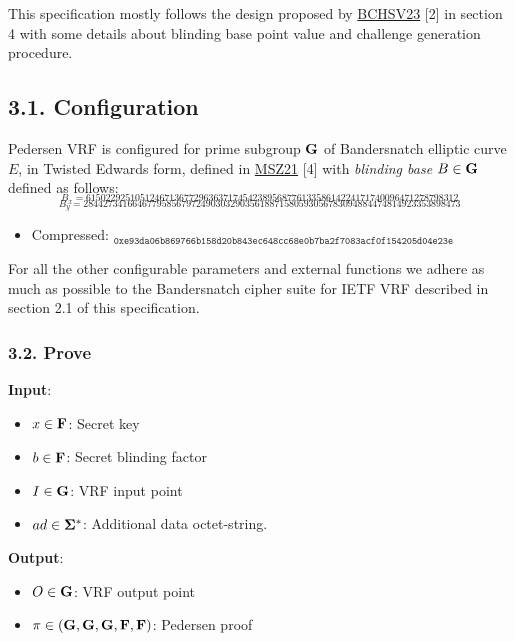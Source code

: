 \documentclass[
]{article}
\providecommand{\tightlist}{%
  \setlength{\itemsep}{0pt}\setlength{\parskip}{0pt}}
\begin{document}
This specification mostly follows the design proposed by
\href{https://eprint.iacr.org/2023/002}{BCHSV23} {[}2{]} in section 4
with some details about blinding base point value and challenge
generation procedure.

\subsection{3.1. Configuration}\label{configuration-1}

Pedersen VRF is configured for prime subgroup \(\bold{G}\) of
Bandersnatch elliptic curve \(E\), in Twisted Edwards form, defined in
\href{https://eprint.iacr.org/2021/1152}{MSZ21} {[}4{]} with
\emph{blinding base} \(B \in \bold{G}\) defined as follows:
\[_{B_x = 6150229251051246713677296363717454238956877613358614224171740096471278798312}\]
\[_{B_y = 28442734166467795856797249030329035618871580593056783094884474814923353898473}\]

\begin{itemize}
\tightlist
\item
  Compressed:
  \(_{\texttt{0xe93da06b869766b158d20b843ec648cc68e0b7ba2f7083acf0f154205d04e23e}}\)
\end{itemize}

For all the other configurable parameters and external functions we
adhere as much as possible to the Bandersnatch cipher suite for IETF VRF
described in section 2.1 of this specification.

\subsubsection{3.2. Prove}\label{prove-1}

\textbf{Input}:

\begin{itemize}
\tightlist
\item
  \(x \in \bold{F}\): Secret key
\item
  \(b \in \bold{F}\): Secret blinding factor
\item
  \(I \in \bold{G}\): VRF input point
\item
  \(ad \in \bold{\Sigma}^*\): Additional data octet-string.
\end{itemize}

\textbf{Output}:

\begin{itemize}
\tightlist
\item
  \(O \in \bold{G}\): VRF output point
\item
  \(\pi \in (\bold{G}, \bold{G}, \bold{G}, \bold{F}, \bold{F})\):
  Pedersen proof
\end{itemize}
\end{document}
